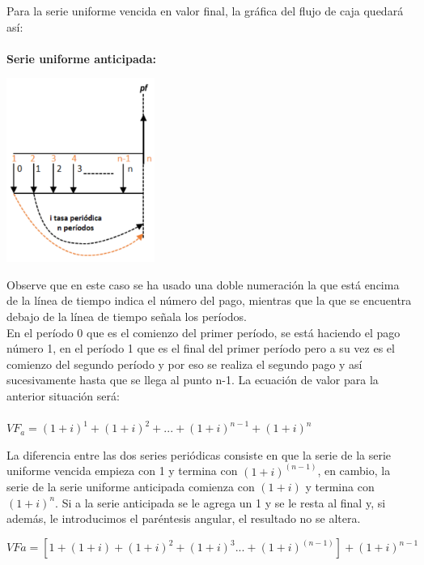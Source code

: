 	Para la serie uniforme vencida en valor final, la gráfica del flujo de caja quedará así:
	\textbf{\\ \\ Serie uniforme anticipada:}
	\begin{center}

		\includegraphics[height=6cm]{4_Capitulo/img/ejemplos/4_15.pdf}

	\end{center}
	Observe que en este caso se ha usado una doble numeración la que está encima de la línea de tiempo indica el número del pago, mientras que la que se encuentra debajo de la línea de tiempo señala los períodos. \\

	En el período 0 que es el comienzo del primer período, se está haciendo el pago número 1, en el período 1 que es el final del primer período pero a su vez es el comienzo del segundo período y por eso se realiza el segundo pago y así sucesivamente hasta que se llega al punto n-1. La ecuación de valor para la anterior situación será:\\\\
	\vspace{5mm}
$VF_{a}=(1+i)^{1}  +(1+i)^{2}+...+(1+i)^{n-1}+(1+i)^{n}$
	\vspace{5mm}


	La diferencia entre las dos series periódicas consiste en que la serie de la serie uniforme vencida empieza con 1 y termina con $(1+i)^{(n-1)}$, en cambio, la serie de la serie uniforme anticipada comienza con $(1+i)$  y termina con $(1+i)^{n}$. Si a la serie anticipada se le agrega un 1 y se le resta al final y, si además, le introducimos el paréntesis angular, el resultado no se altera.

	\vspace{5mm}
$VFa=[1+(1+i) +(1+i)^{2}+(1+i)^{3}...+(1+i)^{(n-1)} ]+(1+i)^{n-1}$
	\vspace{5mm}

